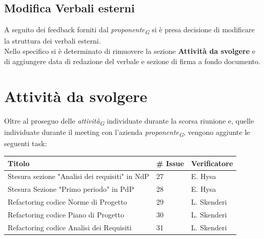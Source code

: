 \documentclass{article}
\begin{document}
    \subsection{Modifica Verbali esterni}
        A seguito dei feedback forniti dal \textit{proponente}\textsubscript{\textit{G}} si è presa decisione di modificare la struttura dei verbali esterni.\\
        Nello specifico si è determinato di rimuovere la sezione \textbf{Attività da svolgere} e di aggiungere data di redazione del verbale e sezione di firma a fondo documento. 

\section{Attività da svolgere}
Oltre al proseguo delle \textit{attività}\textsubscript{\textit{G}} individuate durante la scorsa riunione e, quelle individuate durante il meeting con l'azienda \textit{proponente}\textsubscript{\textit{G}}, vengono aggiunte le seguenti task:  

    \begin{center}
        \begin{tabular}{|C{7cm}|C{1,5cm}|C{3cm}|}
            \hline
            \textbf{Titolo} & \textbf{\# Issue} & \textbf{Verificatore} \\
            \hline\hline
            Stesura sezione "Analisi dei requisiti" in NdP & 27 & E. Hysa\\
            Stesura Sezione "Primo periodo" in PdP & 28 & E. Hysa\\
            Refactoring codice Norme di Progetto & 29 & L. Skenderi\\
            Refactoring codice Piano di Progetto & 30 & L. Skenderi\\
            Refactoring codice Analisi dei Requisiti & 31 & L. Skenderi\\
            \hline
        \end{tabular}
    \end{center}
\end{document}
